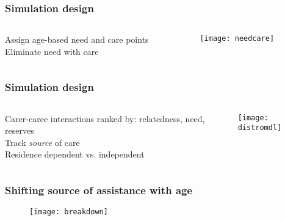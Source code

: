 \documentclass{beamer}
\begin{document}

\begin{frame}
\frametitle{Simulation design}

\begin{columns}
\begin{column}{.5\textwidth}
Assign age-based need and care points  \\
\vspace{0.5cm}
Eliminate need with care
\end{column}

\begin{column}{.5\textwidth}
\texttt{[image: needcare]}\\
\end{column}
\end{columns}

\end{frame}


\begin{frame}
\frametitle{Simulation design}

\begin{columns}
\begin{column}{.5\textwidth}
Carer-caree interactions ranked by: relatedness, need, reserves \\
\vspace{0.5cm}
Track \emph{source} of care \\
\vspace{0.5cm}
Residence dependent vs. independent
\end{column}

\begin{column}{.5\textwidth}
\texttt{[image: distromdl]}\\
\end{column}
\end{columns}

\end{frame}


\begin{frame}
\frametitle{Shifting source of assistance with age}
\begin{figure}
\texttt{[image: breakdown]}
\end{figure}
\end{frame}
\end{document}
